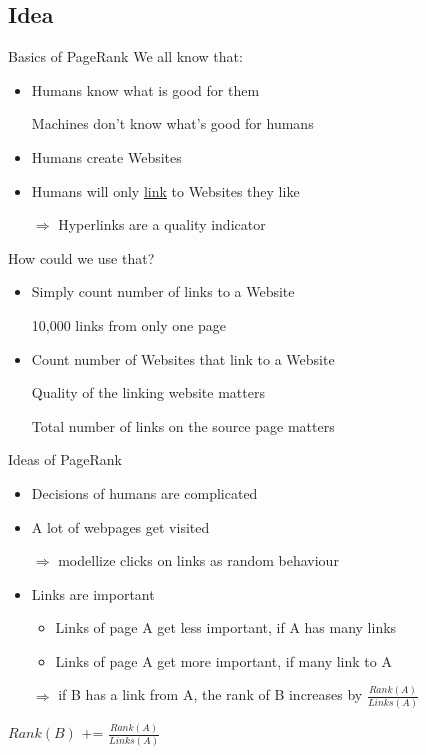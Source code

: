 \subsection{Idea}
\begin{frame}{Basics of PageRank}
    We all know that:
    \begin{itemize}[<+->]
        \item Humans know what is good for them
        \item[\xmark] Machines don't know what's good for humans
        \item Humans create Websites
        \item Humans will only \href{http://en.wikipedia.org/wiki/Hyperlink}{link} to Websites they like
        \item[$\Rightarrow$] Hyperlinks are a quality indicator
    \end{itemize}
\end{frame}

\begin{frame}{How could we use that?}
    \begin{itemize}[<+->]
        \item Simply count number of links to a Website
        \item[\xmark] 10,000 links from only one page
        \item Count number of Websites that link to a Website
        \item[\xmark] Quality of the linking website matters
        \item[\xmark] Total number of links on the source page matters
    \end{itemize}
\end{frame}


\begin{frame}{Ideas of PageRank}
    \begin{itemize}[<+->]
        \item Decisions of humans are complicated
        \item A lot of webpages get visited
        \item[$\Rightarrow$] modellize clicks on links as random behaviour
        \item Links are important
        \begin{itemize}
            \item Links of page A get less important, if A has many links
            \item Links of page A get more important, if many link to A
        \end{itemize}
        \item[$\Rightarrow$] if B has a link from A, the rank of B increases by $\frac{Rank(A)}{Links(A)}$
    \end{itemize}

    \pause[\thebeamerpauses]

    \begin{algorithmic}
            \State $Rank(B)$ += $\frac{Rank(A)}{Links(A)}$
        \EndIf
    \end{algorithmic}
\end{frame}

